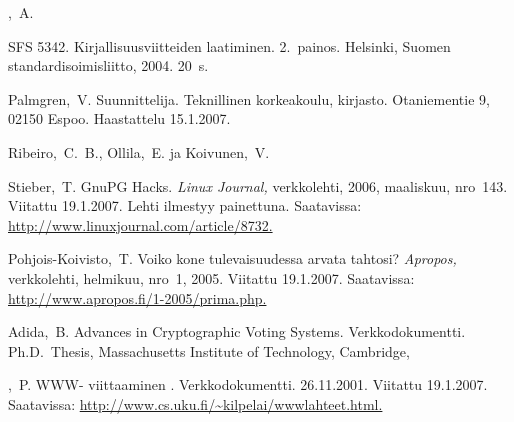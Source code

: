  ,\ A.
  

 SFS 5342. Kirjallisuusviitteiden laatiminen. 2.\ painos.
  Helsinki, Suomen standardisoimisliitto, 2004. 20~s.

 Palmgren,\ V. Suunnittelija. Teknillinen
  korkeakoulu, kirjasto. Otaniementie 9, 02150 Espoo. Haastattelu
  15.1.2007.

 Ribeiro,\ C.\ B., Ollila,\ E. ja Koivunen,\ V.
  

 Stieber,\ T. GnuPG Hacks. \textit{Linux Journal,}
  verkkolehti, 2006, maaliskuu, nro~143. Viitattu 19.1.2007. Lehti
  ilmestyy  painettuna. Saatavissa:
  \url{http://www.linuxjournal.com/article/8732.}

 Pohjois-Koivisto,\ T. Voiko kone tulevaisuudessa arvata
  tahtosi?  \textit{Apropos,} verkkolehti, helmikuu, nro~1, 2005.
  Viitattu 19.1.2007.  Saatavissa:
  \url{http://www.apropos.fi/1-2005/prima.php.}

 Adida,\ B.  Advances in Cryptographic Voting Systems.
  Verkkodokumentti. Ph.D.\ Thesis, Massachusetts Institute of
  Technology, Cambridge, 

 ,\ P. WWW- viittaaminen
  . Verkkodokumentti.  26.11.2001.
  Viitattu 19.1.2007. Saatavissa:
  \url{http://www.cs.uku.fi/~kilpelai/wwwlahteet.html.}